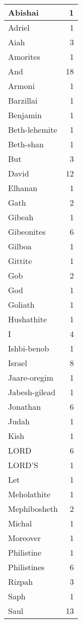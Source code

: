 \begin{center}
\begin{longtable}{l|r}
\hline \hline
\endlastfoot
Abishai & 1 \\ \hline
Adriel & 1 \\ \hline
Aiah & 3 \\ \hline
Amorites & 1 \\ \hline
And & 18 \\ \hline
Armoni & 1 \\ \hline
Barzillai & 1 \\ \hline
Benjamin & 1 \\ \hline
Beth-lehemite & 1 \\ \hline
Beth-shan & 1 \\ \hline
But & 3 \\ \hline
David & 12 \\ \hline
Elhanan & 1 \\ \hline
Gath & 2 \\ \hline
Gibeah & 1 \\ \hline
Gibeonites & 6 \\ \hline
Gilboa & 1 \\ \hline
Gittite & 1 \\ \hline
Gob & 2 \\ \hline
God & 1 \\ \hline
Goliath & 1 \\ \hline
Hushathite & 1 \\ \hline
I & 4 \\ \hline
Ishbi-benob & 1 \\ \hline
Israel & 8 \\ \hline
Jaare-oregim & 1 \\ \hline
Jabesh-gilead & 1 \\ \hline
Jonathan & 6 \\ \hline
Judah & 1 \\ \hline
Kish & 1 \\ \hline
LORD & 6 \\ \hline
LORD'S & 1 \\ \hline
Let & 1 \\ \hline
Meholathite & 1 \\ \hline
Mephibosheth & 2 \\ \hline
Michal & 1 \\ \hline
Moreover & 1 \\ \hline
Philistine & 1 \\ \hline
Philistines & 6 \\ \hline
Rizpah & 3 \\ \hline
Saph & 1 \\ \hline
Saul & 13 \\ \hline

\end{longtable}
\end{center}
